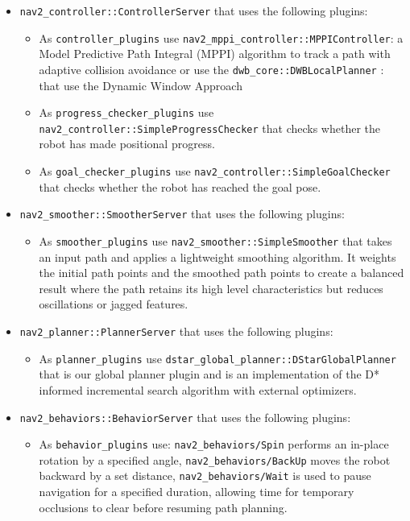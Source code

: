 \begin{itemize}
	\item \texttt{nav2\_controller::ControllerServer} that uses the following plugins:
	\begin{itemize}
		\item As \texttt{controller\_plugins} use \texttt{nav2\_mppi\_controller::MPPIController}: a Model Predictive Path Integral (MPPI)\cite{7487277} algorithm to track a path with adaptive collision avoidance or use the \texttt{dwb\_core::DWBLocalPlanner} : that use the Dynamic Window Approach \cite{580977}
		
		\item As \texttt{progress\_checker\_plugins} use\\ \texttt{nav2\_controller::SimpleProgressChecker} that checks whether the robot has made positional progress.
		
		\item As \texttt{goal\_checker\_plugins} use \texttt{nav2\_controller::SimpleGoalChecker} that checks whether the robot has reached the goal pose.
	\end{itemize}
	
	\item \texttt{nav2\_smoother::SmootherServer} that uses the following plugins:
	\begin{itemize}
		\item As \texttt{smoother\_plugins} use \texttt{nav2\_smoother::SimpleSmoother} that takes an input path and applies a lightweight smoothing algorithm. It weights the initial path points and the smoothed path points to create a balanced result where the path retains its high level characteristics but reduces oscillations or jagged features.
	\end{itemize}
	
	\item \texttt{nav2\_planner::PlannerServer} that uses the following plugins:
	\begin{itemize}
		\item As \texttt{planner\_plugins} use  \texttt{dstar\_global\_planner::DStarGlobalPlanner} that is our global planner plugin and is an implementation of the D* informed incremental search algorithm with external optimizers\cite{10.1007/978-3-031-67295-8_33}.
	\end{itemize}
	
	\item \texttt{nav2\_behaviors::BehaviorServer} that uses the following plugins:
	\begin{itemize}
		\item As \texttt{behavior\_plugins} use:
		\texttt{nav2\_behaviors/Spin} performs an in-place rotation by a specified angle,
		\texttt{nav2\_behaviors/BackUp} moves the robot backward by a set distance,
		\texttt{nav2\_behaviors/Wait}  is used to pause navigation for a specified duration, allowing time for temporary occlusions to clear before resuming path planning.
	\end{itemize}
	

\end{itemize}
